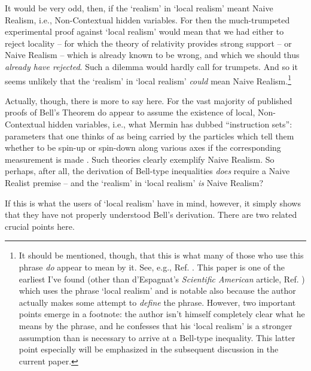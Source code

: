 \documentclass[12pt]{article}
\begin{document}
It would be very odd, then, if the `realism' in `local realism'
meant Naive Realism, i.e., Non-Contextual hidden variables.  For then
the much-trumpeted experimental proof against `local realism' would
mean that we had either to reject locality -- for which the theory of 
relativity provides strong support -- or Naive Realism -- which is already
known to be wrong, and which we should thus \emph{already have
  rejected}.  Such a dilemma would hardly call for trumpets.
And so it seems unlikely that the `realism' in `local realism'
\emph{could} mean Naive Realism.\footnote{It should be 
mentioned, though, that this is what many of
  those who use this phrase \emph{do} appear to mean by it.  See,
  e.g., Ref. \cite{mermin1980}.  This paper is one
  of the earliest I've found (other than d'Espagnat's \emph{Scientific 
  American} article, Ref. \cite{despagnat}) which
  uses the phrase `local realism' and is notable also because the
  author actually makes some attempt to \emph{define} the phrase.
  However, two important points emerge in a footnote:  the author
  isn't himself completely clear what he means by the phrase, and 
  he confesses that his 
  `local realism' is a stronger assumption than is
  necessary to arrive at a Bell-type inequality.  This latter point
  especially will be emphasized in the subsequent discussion in the
  current paper.}

Actually, though, there is more to say here.  For the vast majority of
published proofs of Bell's Theorem do appear to assume the existence
of local, Non-Contextual hidden variables, i.e., what Mermin has
dubbed ``instruction sets'':  parameters that one thinks of as being
carried by the particles which tell them whether to be spin-up or
spin-down along various axes if the corresponding measurement is
made \cite{nrbellproofs}. Such theories clearly exemplify Naive
Realism.  So perhaps,
after all, the derivation of Bell-type inequalities \emph{does}
require a Naive Realist premise -- and the `realism' in `local
realism' \emph{is} Naive Realism?

If this is what the users of `local realism' have in mind, however,
it simply shows that they have not properly understood Bell's
derivation.  There are two related crucial points here.
\end{document}
